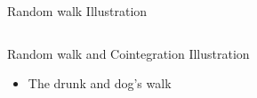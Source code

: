 \documentclass{beamer}
\begin{document}
\begin{frame}[t,fragile]{Random walk Illustration}
\begin{columns}
\begin{column}{.08\linewidth}
\end{column}
\end{columns}
\end{frame}

\begin{frame}[t,fragile]{Random walk and Cointegration Illustration}
 \begin{itemize}
  \item The drunk and dog's walk
 \end{itemize}
    \begin{center}
    \end{center}
\end{frame}
\end{document}
